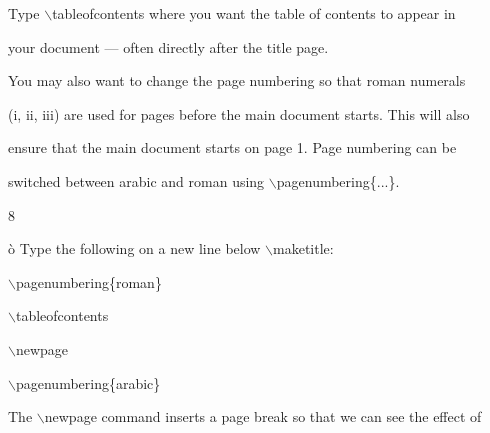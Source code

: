 \documentclass[a4paper,portrait,12pt]{article}
\begin{document}
\begin{flushleft}
Type \ensuremath{\backslash}tableofcontents where you want the table of contents to appear in
\end{flushleft}


\begin{flushleft}
your document --- often directly after the title page.
\end{flushleft}


\begin{flushleft}
You may also want to change the page numbering so that roman numerals
\end{flushleft}


\begin{flushleft}
(i, ii, iii) are used for pages before the main document starts. This will also
\end{flushleft}


\begin{flushleft}
ensure that the main document starts on page 1. Page numbering can be
\end{flushleft}


\begin{flushleft}
switched between arabic and roman using \ensuremath{\backslash}pagenumbering\{...\}.
\end{flushleft}


8





\begin{flushleft}
\newpage
\`{o} Type the following on a new line below \ensuremath{\backslash}maketitle:
\end{flushleft}


\begin{flushleft}
\ensuremath{\backslash}pagenumbering\{roman\}
\end{flushleft}


\begin{flushleft}
\ensuremath{\backslash}tableofcontents
\end{flushleft}


\begin{flushleft}
\ensuremath{\backslash}newpage
\end{flushleft}


\begin{flushleft}
\ensuremath{\backslash}pagenumbering\{arabic\}
\end{flushleft}


\begin{flushleft}
The \ensuremath{\backslash}newpage command inserts a page break so that we can see the effect of
\end{flushleft}
\end{document}
